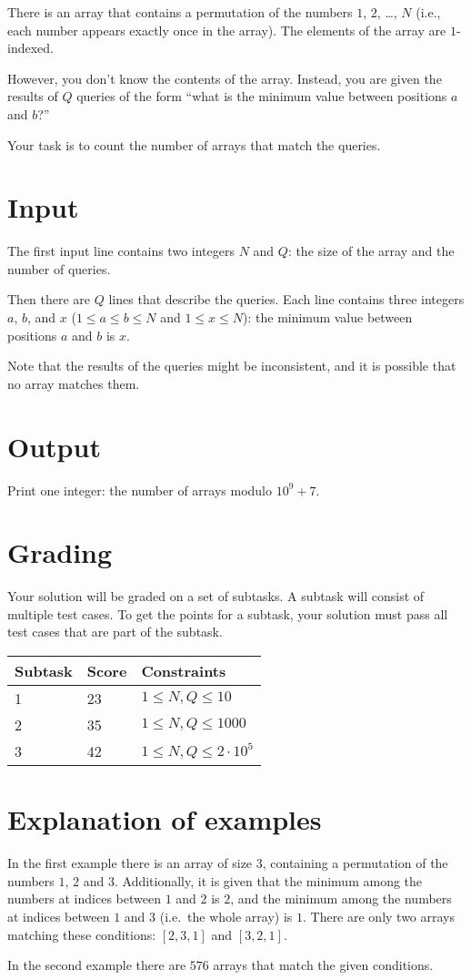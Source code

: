 \def\version{1}

There is an array that contains a permutation of the numbers $1$, $2$, \ldots,
$N$ (i.e., each number appears exactly once in the array).
The elements of the array are $1$-indexed.

However, you don't know the contents of the array. Instead, you are given the
results of $Q$ queries of the form ``what is the minimum value between
positions $a$ and $b$?''

Your task is to count the number of arrays that match the queries.

\section*{Input}
The first input line contains two integers $N$ and $Q$: the size of the array
and the number of queries.

Then there are $Q$ lines that describe the queries. Each line contains three
integers $a$, $b$, and $x$ ($1 \le a \le b \le N$ and $1 \le x \le N$):
the minimum value between positions $a$ and $b$ is $x$.

Note that the results of the queries might be inconsistent,
and it is possible that no array matches them.

\section*{Output}
Print one integer: the number of arrays modulo $10^9+7$.

\section*{Grading}
Your solution will be graded on a set of subtasks. A subtask will consist of
multiple test cases. To get the points for a subtask, your solution must pass
all test cases that are part of the subtask.

\noindent
\begin{tabular}{| l | l | l |}
\hline
Subtask & Score & Constraints \\ \hline
1 & 23 & $1 \leq N,Q \leq 10$ \\ \hline
2 & 35 & $1 \leq N,Q \leq 1000$ \\ \hline
3 & 42 & $1 \leq N,Q \leq 2\cdot 10^5$ \\ \hline
\end{tabular}

\section*{Explanation of examples}
In the first example there is an array of size $3$, containing a permutation of
the numbers $1$, $2$ and $3$. Additionally, it is given that the minimum among
the numbers at indices between $1$ and $2$ is $2$, and the minimum among the
numbers at indices between $1$ and $3$ (i.e.\ the whole array) is $1$.
There are only two arrays matching these conditions: $[2,3,1]$ and $[3,2,1]$.

In the second example there are $576$ arrays that match the given
conditions.

